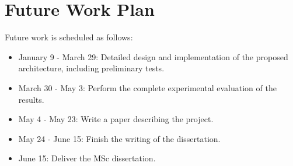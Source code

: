 

\section{Future Work Plan}
\label{sec:workplan}

Future work is scheduled as follows:

\begin{itemize}
	\item January 9 - March 29: Detailed design and implementation of the
	proposed architecture, including preliminary tests.
	\item March 30 - May 3: Perform the complete experimental evaluation
	of the results.
	\item May 4 - May 23: Write a paper describing the project.
	\item May 24 - June 15: Finish the writing of the dissertation.
	\item June 15: Deliver the MSc dissertation.
\end{itemize}

%			
%			
%			
%			
